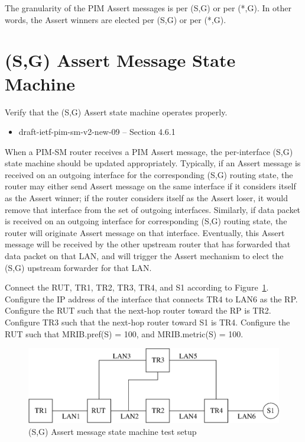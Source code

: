 \documentclass[11pt]{report}
\begin{document}
The granularity of the PIM Assert messages is per (S,G) or per (*,G).
In other words, the Assert winners are elected per (S,G) or per (*,G).


\newpage
\section{(S,G) Assert Message State Machine}

Verify that the (S,G) Assert state machine operates properly.

\begin{itemize}
  \item draft-ietf-pim-sm-v2-new-09 -- Section 4.6.1
\end{itemize}

When a PIM-SM router receives a PIM Assert message, the per-interface
(S,G) state machine should be updated appropriately. Typically, if an
Assert message is received on an outgoing interface for the corresponding
(S,G) routing state, the router may either send Assert message on the
same interface if it considers itself as the Assert winner; if the router
considers itself as the Assert loser, it would remove that interface from the
set of outgoing interfaces. Similarly, if data packet is received on an
outgoing interface for corresponding (S,G) routing state, the router will
originate Assert message on that interface. Eventually, this Assert message
will be received by the other upstream router that has forwarded that data
packet on that LAN, and will trigger the Assert mechanism to elect the (S,G)
upstream forwarder for that LAN.

Connect the RUT, TR1, TR2, TR3, TR4, and S1 according to
Figure~\ref{fig:pim_test_5_1_sg_assert_message_state_machine}.
Configure the IP address of the interface that connects TR4 to LAN6 as the RP.
Configure the RUT such that the next-hop router toward the RP is TR2.
Configure TR3 such that the next-hop router toward S1 is TR4.
Configure the RUT such that MRIB.pref(S) = 100, and MRIB.metric(S) = 100.

\begin{figure}[htbp]
  \begin{center}
    \includegraphics[scale=0.8]{figs/pim_test_5_1_sg_assert_message_state_machine}
    \caption{(S,G) Assert message state machine test setup}
    \label{fig:pim_test_5_1_sg_assert_message_state_machine}
  \end{center}
\end{figure}
\end{document}
